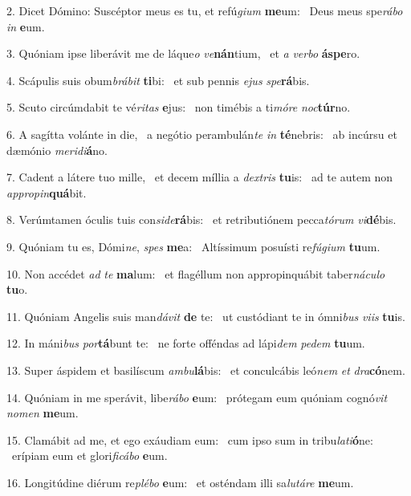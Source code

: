 2. Dicet Dómino: Suscéptor meus es tu, et refú\textit{gi}\textit{um} \textbf{me}um: \ast\  Deus meus spe\textit{rá}\textit{bo} \textit{in} \textbf{e}um.\

3. Quóniam ipse liberávit me de láque\textit{o} \textit{ve}\textbf{nán}tium, \ast\  et \textit{a} \textit{ver}\textit{bo} \textbf{ás}\textbf{pe}ro.\

4. Scápulis suis obum\textit{brá}\textit{bit} \textbf{ti}bi: \ast\  et sub pennis \textit{e}\textit{jus} \textit{spe}\textbf{rá}bis.\

5. Scuto circúmdabit te vé\textit{ri}\textit{tas} \textbf{e}jus: \ast\  non timébis a ti\textit{mó}\textit{re} \textit{noc}\textbf{túr}no.\

6. A sagítta volánte in die, \dag\  a negótio perambulán\textit{te} \textit{in} \textbf{té}nebris: \ast\  ab incúrsu et dæmónio \textit{me}\textit{ri}\textit{di}\textbf{á}no.\

7. Cadent a látere tuo mille, \dag\  et decem míllia a \textit{dex}\textit{tris} \textbf{tu}is: \ast\  ad te autem non \textit{ap}\textit{pro}\textit{pin}\textbf{quá}bit.\

8. Verúmtamen óculis tuis con\textit{si}\textit{de}\textbf{rá}bis: \ast\  et retributiónem pecca\textit{tó}\textit{rum} \textit{vi}\textbf{dé}bis.\

9. Quóniam tu es, Dómi\textit{ne}, \textit{spes} \textbf{me}a: \ast\  Altíssimum posuísti re\textit{fú}\textit{gi}\textit{um} \textbf{tu}um.\

10. Non accédet \textit{ad} \textit{te} \textbf{ma}lum: \ast\  et flagéllum non appropinquábit taber\textit{ná}\textit{cu}\textit{lo} \textbf{tu}o.\

11. Quóniam Angelis suis man\textit{dá}\textit{vit} \textbf{de} te: \ast\  ut custódiant te in ómni\textit{bus} \textit{vi}\textit{is} \textbf{tu}is.\

12. In máni\textit{bus} \textit{por}\textbf{tá}bunt te: \ast\  ne forte offéndas ad lápi\textit{dem} \textit{pe}\textit{dem} \textbf{tu}um.\

13. Super áspidem et basilíscum \textit{am}\textit{bu}\textbf{lá}bis: \ast\  et conculcábis leó\textit{nem} \textit{et} \textit{dra}\textbf{có}nem.\

14. Quóniam in me sperávit, libe\textit{rá}\textit{bo} \textbf{e}um: \ast\  prótegam eum quóniam cognó\textit{vit} \textit{no}\textit{men} \textbf{me}um.\

15. Clamábit ad me, et ego exáudiam eum: \dag\  cum ipso sum in tribu\textit{la}\textit{ti}\textbf{ó}ne: \ast\  erípiam eum et glori\textit{fi}\textit{cá}\textit{bo} \textbf{e}um.\

16. Longitúdine diérum re\textit{plé}\textit{bo} \textbf{e}um: \ast\  et osténdam illi sa\textit{lu}\textit{tá}\textit{re} \textbf{me}um.\

